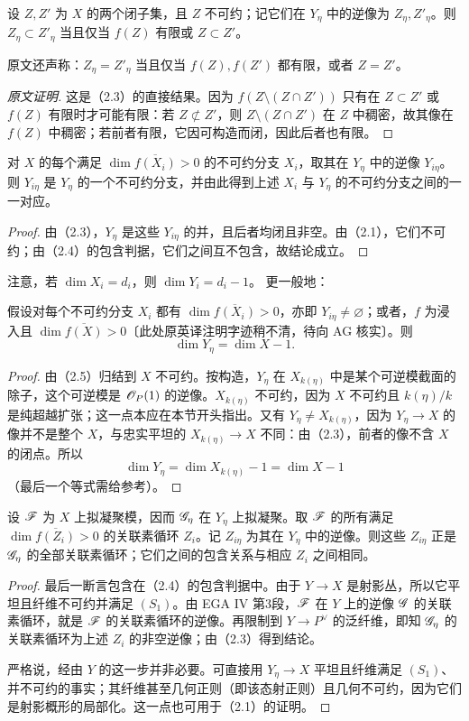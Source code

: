 设 $Z,Z'$ 为 $X$ 的两个闭子集，且 $Z$ 不可约；记它们在 $Y_\eta$ 中的逆像为 $Z_\eta,Z'_\eta$。则 $Z_\eta\subset Z'_\eta$ 当且仅当 $f(Z)$ 有限或 $Z\subset Z'$。

原文还声称：$Z_\eta=Z'_\eta$ 当且仅当 $f(Z),f(Z')$ 都有限，或者 $Z=Z'$。
\begin{proof}[原文证明]
这是（2.3）的直接结果。因为 $f(Z\setminus(Z\cap Z'))$ 只有在 $Z\subset Z'$ 或 $f(Z)$ 有限时才可能有限：若 $Z\not\subset Z'$，则 $Z\setminus(Z\cap Z')$ 在 $Z$ 中稠密，故其像在 $f(Z)$ 中稠密；若前者有限，它因可构造而闭，因此后者也有限。
\end{proof}

对 $X$ 的每个满足 $\dim\overline{f(X_i)}>0$ 的不可约分支 $X_i$，取其在 $Y_\eta$ 中的逆像 $Y_{i\eta}$。则 $Y_{i\eta}$ 是 $Y_\eta$ 的一个不可约分支，并由此得到上述 $X_i$ 与 $Y_\eta$ 的不可约分支之间的一一对应。
\begin{proof}
由（2.3），$Y_\eta$ 是这些 $Y_{i\eta}$ 的并，且后者均闭且非空。由（2.1），它们不可约；由（2.4）的包含判据，它们之间互不包含，故结论成立。
\end{proof}
注意，若 $\dim X_i=d_i$，则 $\dim Y_i=d_i-1$。
更一般地：

假设对每个不可约分支 $X_i$ 都有 $\dim\overline{f(X_i)}>0$，亦即 $Y_{i\eta}\ne\varnothing$；或者，$f$ 为浸入且 $\dim\overline{f(X)}>0$〔此处原英译注明字迹稍不清，待向 AG 核实〕。则
\[
 \dim Y_\eta=\dim X-1.
\]
\begin{proof}
由（2.5）归结到 $X$ 不可约。按构造，$Y_\eta$ 在 $X_{k(\eta)}$ 中是某个可逆模截面的除子，这个可逆模是 $\mathscr O_P(1)$ 的逆像。$X_{k(\eta)}$ 不可约，因为 $X$ 不可约且 $k(\eta)/k$ 是纯超越扩张；这一点本应在本节开头指出。又有 $Y_\eta\ne X_{k(\eta)}$，因为 $Y_\eta\to X$ 的像并不是整个 $X$，与忠实平坦的 $X_{k(\eta)}\to X$ 不同：由（2.3），前者的像不含 $X$ 的闭点。所以
\[
 \dim Y_\eta=\dim X_{k(\eta)}-1=\dim X-1
\]
（最后一个等式需给参考）。
\end{proof}

设 $\mathscr F$ 为 $X$ 上拟凝聚模，因而 $\mathscr G_\eta$ 在 $Y_\eta$ 上拟凝聚。取 $\mathscr F$ 的所有满足 $\dim\overline{f(Z_i)}>0$ 的关联素循环 $Z_i$。记 $Z_{i\eta}$ 为其在 $Y_\eta$ 中的逆像。则这些 $Z_{i\eta}$ 正是 $\mathscr G_\eta$ 的全部关联素循环；它们之间的包含关系与相应 $Z_i$ 之间相同。
\begin{proof}
最后一断言包含在（2.4）的包含判据中。由于 $Y\to X$ 是射影丛，所以它平坦且纤维不可约并满足 $(S_1)$。由 EGA IV 第3段，$\mathscr F$ 在 $Y$ 上的逆像 $\mathscr G$ 的关联素循环，就是 $\mathscr F$ 的关联素循环的逆像。再限制到 $Y\to P^\vee$ 的泛纤维，即知 $\mathscr G_\eta$ 的关联素循环为上述 $Z_i$ 的非空逆像；由（2.3）得到结论。

严格说，经由 $Y$ 的这一步并非必要。可直接用 $Y_\eta\to X$ 平坦且纤维满足 $(S_1)$、并不可约的事实；其纤维甚至几何正则（即该态射正则）且几何不可约，因为它们是射影概形的局部化。这一点也可用于（2.1）的证明。
\end{proof}

